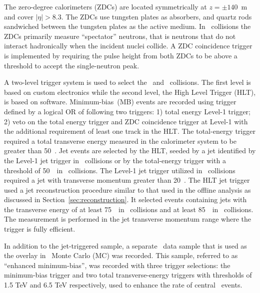 The zero-degree calorimeters (ZDCs) are located symmetrically at $z = \pm140$~m and cover $|\eta| > 8.3$.
The ZDCs use tungsten plates as absorbers, and quartz rods sandwiched between the tungsten plates as the active medium. In \PbPb\ collisions the ZDCs primarily measure ``spectator'' neutrons, that is neutrons that do not interact
hadronically when the incident nuclei collide. A ZDC coincidence trigger is implemented by requiring
the pulse height from both ZDCs to be above a threshold to accept the single-neutron peak.

A two-level trigger system is used to select the \PbPb\ and \pp\ collisions. The first level is based on custom electronics while the second level, the High Level Trigger (HLT), is based on software. 
Minimum-bias~(MB) events are recorded using trigger defined by a logical OR of following two triggers: 1) total energy Level-1 trigger; 2) veto on the total energy trigger and ZDC coincidence trigger at Level-1 with the additional requirement of least one track in the HLT. The total-energy trigger required a total transverse energy measured in the calorimeter system to be greater than 50~\GeV.  Jet events are selected by the HLT, seeded by a jet identified by the Level-1 jet trigger in \pp\ collisions or by the total-energy trigger with a threshold of 50~\GeV\ in \PbPb\ collisions. The Level-1 jet trigger utilized in \pp\ collisions required a jet with transverse momentum greater than 20~\GeV.
The HLT jet trigger used a jet reconstruction procedure similar to that used in the offline 
analysis as discussed in Section~\ref{sec:reconstruction}. 
It selected events containing jets with the transverse energy 
of at least 75~\GeV\ in \PbPb\ collisions and at least 
85~\GeV\ in \pp\ collisions. The measurement is performed in the 
jet transverse momentum range where the trigger is fully efficient.


In addition to the jet-triggered sample, a separate \PbPb\ data sample that is used as the overlay in \PbPb\ Monte Carlo (MC) was recorded. This sample, referred to as ``enhanced minimum-bias'', was recorded with  three trigger selections: the minimum-bias trigger and two total transverse-energy triggers with thresholds of 1.5 TeV and 6.5 TeV respectively, used to enhance the rate of central \pbpb\ events.





